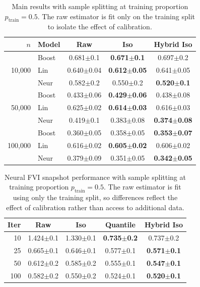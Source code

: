 \documentclass{article}
\theoremstyle{plain}
\theoremstyle{definition}
\theoremstyle{remark}
\begin{document}
\begin{table}[h]
\centering
\small
\begin{tabular}{r l ccc}
\toprule
$n$ & Model & Raw & Iso & Hybrid Iso \\
\midrule
\multirow{3}{*}{10{,}000}
& Boost & 0.681$\pm$0.1 & \textbf{0.671$\pm$0.1} & 0.697$\pm$0.2 \\
& Lin  & 0.640$\pm$0.04 & \textbf{0.612$\pm$0.05} & 0.641$\pm$0.05 \\
& Neur  & 0.582$\pm$0.2 & 0.550$\pm$0.2 & \textbf{0.520$\pm$0.1} \\
\midrule
\multirow{3}{*}{50{,}000}
& Boost & 0.433$\pm$0.06 & \textbf{0.429$\pm$0.06} & 0.438$\pm$0.08 \\
& Lin  & 0.625$\pm$0.02 & \textbf{0.614$\pm$0.03} & 0.616$\pm$0.03 \\
& Neur  & 0.419$\pm$0.1 & 0.383$\pm$0.08 & \textbf{0.374$\pm$0.08} \\
\midrule
\multirow{3}{*}{100{,}000}
& Boost & 0.360$\pm$0.05 & 0.358$\pm$0.05 & \textbf{0.353$\pm$0.07} \\
& Lin  & 0.616$\pm$0.02 & \textbf{0.605$\pm$0.02} & 0.606$\pm$0.02 \\
& Neur  & 0.379$\pm$0.09 & 0.351$\pm$0.05 & \textbf{0.342$\pm$0.05} \\
\bottomrule
\end{tabular}
\caption{Main results with sample splitting at training proportion \(p_{\mathrm{train}}=0.5\). The raw estimator is fit only on the training split to isolate the effect of calibration.}
\label{tab:main-split}
\end{table}




\begin{table}[h]
\centering
\small
\begin{tabular}{r cccc}
\toprule
Iter & Raw & Iso & Quantile & Hybrid Iso \\
\midrule
10  & 1.424$\pm$0.1 & 1.330$\pm$0.1 & \textbf{0.735$\pm$0.2} & 0.737$\pm$0.2 \\
25  & 0.665$\pm$0.1 & 0.646$\pm$0.1 & 0.577$\pm$0.1 & \textbf{0.571$\pm$0.1} \\
50  & 0.612$\pm$0.2 & 0.585$\pm$0.2 & 0.555$\pm$0.1 & \textbf{0.547$\pm$0.1} \\
100 & 0.582$\pm$0.2 & 0.550$\pm$0.2 & 0.524$\pm$0.1 & \textbf{0.520$\pm$0.1} \\
\bottomrule
\end{tabular}
\caption{Neural FVI snapshot performance with sample splitting at training proportion \(p_{\mathrm{train}}=0.5\). The raw estimator is fit using only the training split, so differences reflect the effect of calibration rather than access to additional data.}\label{tab:neural-snap-split}
\end{table}
\end{document}

